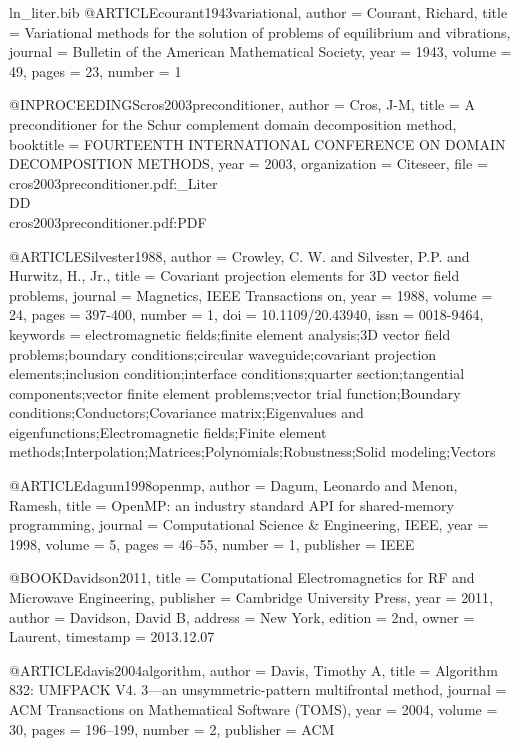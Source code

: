\begin{filecontents*}{ln_liter.bib}
@ARTICLE{courant1943variational,
  author = {Courant, Richard},
  title = {Variational methods for the solution of problems of equilibrium and
	vibrations},
  journal = {Bulletin of the American Mathematical Society},
  year = {1943},
  volume = {49},
  pages = {23},
  number = {1}
}

@INPROCEEDINGS{cros2003preconditioner,
  author = {Cros, J-M},
  title = {A preconditioner for the Schur complement domain decomposition method},
  booktitle = {FOURTEENTH INTERNATIONAL CONFERENCE ON DOMAIN DECOMPOSITION METHODS},
  year = {2003},
  organization = {Citeseer},
  file = {cros2003preconditioner.pdf:_Liter\\DD\\cros2003preconditioner.pdf:PDF}
}

@ARTICLE{Silvester1988,
  author = {Crowley, C. W. and Silvester, P.P. and Hurwitz, H., Jr.},
  title = {Covariant projection elements for {3D} vector field problems},
  journal = {Magnetics, IEEE Transactions on},
  year = {1988},
  volume = {24},
  pages = {397-400},
  number = {1},
  doi = {10.1109/20.43940},
  issn = {0018-9464},
  keywords = {electromagnetic fields;finite element analysis;3D vector field problems;boundary
	conditions;circular waveguide;covariant projection elements;inclusion
	condition;interface conditions;quarter section;tangential components;vector
	finite element problems;vector trial function;Boundary conditions;Conductors;Covariance
	matrix;Eigenvalues and eigenfunctions;Electromagnetic fields;Finite
	element methods;Interpolation;Matrices;Polynomials;Robustness;Solid
	modeling;Vectors}
}

@ARTICLE{dagum1998openmp,
  author = {Dagum, Leonardo and Menon, Ramesh},
  title = {OpenMP: an industry standard API for shared-memory programming},
  journal = {Computational Science \& Engineering, IEEE},
  year = {1998},
  volume = {5},
  pages = {46--55},
  number = {1},
  publisher = {IEEE}
}

@BOOK{Davidson2011,
  title = {Computational Electromagnetics for RF and Microwave Engineering},
  publisher = {Cambridge University Press},
  year = {2011},
  author = {Davidson, David B},
  address = {New York},
  edition = {2nd},
  owner = {Laurent},
  timestamp = {2013.12.07}
}

@ARTICLE{davis2004algorithm,
  author = {Davis, Timothy A},
  title = {Algorithm 832: {UMFPACK V4. 3}---an unsymmetric-pattern multifrontal
	method},
  journal = {ACM Transactions on Mathematical Software (TOMS)},
  year = {2004},
  volume = {30},
  pages = {196--199},
  number = {2},
  publisher = {ACM}
}


\end{filecontents*}
